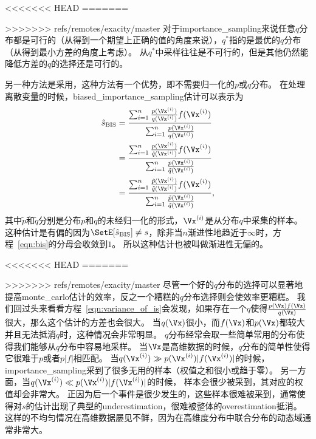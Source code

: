 <<<<<<< HEAD
=======

>>>>>>> refs/remotes/exacity/master
对于\gls{importance_sampling}来说任意$q$分布都是可行的（从得到一个期望上正确的值的角度来说），$q^*$指的是最优的$q$分布（从得到最小方差的角度上考虑）。
从$q^*$中采样往往是不可行的，但是其他仍然能降低方差的$q$的选择还是可行的。



另一种方法是采用，这种方法有一个优势，即不需要归一化的$p$或$q$分布。
在处理离散变量的时候，\gls{biased_importance_sampling}估计可以表示为
\begin{align}
\label{eqn:bis}
\hat{s}_{\text{BIS}} & = \frac{\sum_{i=1}^{n} \frac{p(\Vx^{(i)})}{q(\Vx^{(i)})} f(\Vx^{(i)})}{\sum_{i=1}^{n}\frac{p(\Vx^{(i)})}{q(\Vx^{(i)})}} \\
& = \frac{\sum_{i=1}^{n} \frac{p(\Vx^{(i)})}{\tilde{q}(\Vx^{(i)})} f(\Vx^{(i)})}{\sum_{i=1}^{n}\frac{p(\Vx^{(i)})}{\tilde{q}(\Vx^{(i)})}} \\
& = \frac{\sum_{i=1}^{n} \frac{\tilde{p}(\Vx^{(i)})}{\tilde{q}(\Vx^{(i)})} f(\Vx^{(i)})}{\sum_{i=1}^{n}\frac{\tilde{p}(\Vx^{(i)})}{\tilde{q}(\Vx^{(i)})}},
\end{align}
其中$\tilde{p}$和$\tilde{q}$分别是分布${p}$和${q}$的未经归一化的形式，$\Vx^{(i)}$是从分布${q}$中采集的样本。
这种估计是有偏的因为$\SetE[\hat{s}_{\text{BIS}}]\neq s$，除非当$n$渐进性地趋近于$\infty$时，方程~\eqref{eqn:bis}的分母会收敛到$1$。
所以这种估计也被叫做渐进性无偏的。

<<<<<<< HEAD
=======

>>>>>>> refs/remotes/exacity/master
尽管一个好的$q$分布的选择可以显著地提高\gls{monte_carlo}估计的效率，反之一个糟糕的$q$分布选择则会使效率更糟糕。
我们回过头来看看方程~\eqref{eqn:variance_of_is}会发现，如果存在一个$q$使得$\frac{p(\Vx)f(\Vx)}{q(\Vx)}$很大，那么这个估计的方差也会很大。
当$q(\Vx)$很小，而$f(\Vx)$和$p(\Vx)$都较大并且无法抵消$q$时，这种情况会非常明显。
$q$分布经常会取一些简单常用的分布使得我们能够从$q$分布中容易地采样。
当$\Vx$是高维数据的时候，$q$分布的简单性使得它很难于$p$或者$p\vert f\vert$相匹配。
当$q(\Vx^{(i)})\gg p(\Vx^{(i)}) \vert f(\Vx^{(i)})\vert $的时候，\gls{importance_sampling}采到了很多无用的样本（权值之和很小或趋于零）。
另一方面，当$q(\Vx^{(i)})\ll p(\Vx^{(i)}) \vert f(\Vx^{(i)})\vert $的时候， 样本会很少被采到，其对应的权值却会非常大。
正因为后一个事件是很少发生的，这些样本很难被采到，通常使得对$s$的估计出现了典型的\gls{underestimation}，很难被整体的\gls{overestimation}抵消。
这样的不均匀情况在高维数据屡见不鲜，因为在高维度分布中联合分布的动态域通常非常大。


